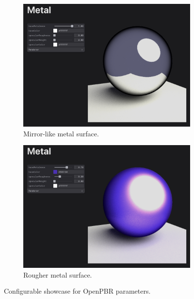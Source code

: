 \begin{figure}[H]
    \centering
    \begin{subfigure}[b]{0.45\textwidth}
        \includegraphics[width=\textwidth]{resources/docu-demo-mirror-metal.png}
        \caption{Mirror-like metal surface.}
        \label{fig:docu-demo-mirror}
    \end{subfigure}
    \hfill
    \begin{subfigure}[b]{0.45\textwidth}
        \includegraphics[width=\textwidth]{resources/docu-demo-rough-metal.png}
        \caption{Rougher metal surface.}
        \label{fig:docu-demo-rough}
    \end{subfigure}
    \caption{Configurable showcase for \gls{OpenPBR} parameters.}
    \label{fig:docu-demo}
\end{figure}

